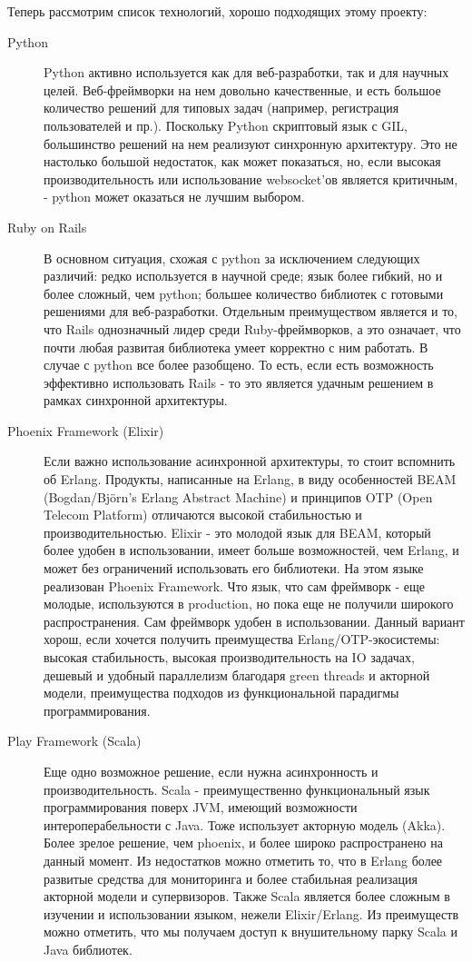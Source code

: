 Теперь рассмотрим список технологий, хорошо подходящих этому проекту:

\begin{description}
	\item[Python] Python активно используется как для веб-разработки, так и для научных целей. Веб-фреймворки на нем довольно качественные, и есть большое количество решений для типовых задач (например, регистрация пользователей и пр.). Поскольку Python скриптовый язык с GIL, большинство решений на нем реализуют синхронную архитектуру. Это не настолько большой недостаток, как может показаться, но, если высокая производительность или использование websocket'ов является критичным, - python может оказаться не лучшим выбором.
	\item[Ruby on Rails] В основном ситуация, схожая с python за исключением следующих различий: редко используется в научной среде; язык более гибкий, но и более сложный, чем python; большее количество библиотек с готовыми решениями для веб-разработки. Отдельным преимуществом является и то, что Rails однозначный лидер среди Ruby-фреймворков, а это означает, что почти любая развитая библиотека умеет корректно с ним работать. В случае с python все более разобщено. То есть, если есть возможность эффективно использовать Rails - то это является удачным решением в рамках синхронной архитектуры.
	\item[Phoenix Framework (Elixir)] Если важно использование асинхронной архитектуры, то стоит вспомнить об Erlang. Продукты, написанные на Erlang, в виду особенностей BEAM (Bogdan/Björn’s Erlang Abstract Machine) и принципов OTP (Open Telecom Platform) отличаются высокой стабильностью и производительностью. Elixir - это молодой язык для BEAM, который более удобен в использовании, имеет больше возможностей, чем Erlang, и может без ограничений использовать его библиотеки. На этом языке реализован Phoenix Framework. Что язык, что сам фреймворк - еще молодые, используются в production, но пока еще не получили широкого распространения. Сам фреймворк удобен в использовании. Данный вариант хорош, если хочется получить преимущества Erlang/OTP-экосистемы: высокая стабильность, высокая производительность на IO задачах, дешевый и удобный параллелизм благодаря green threads и акторной модели, преимущества подходов из функциональной парадигмы программирования.
	\item[Play Framework (Scala)] Еще одно возможное решение, если нужна асинхронность и производительность. Scala - преимущественно функциональный язык программирования поверх JVM, имеющий возможности интероперабельности с Java. Тоже использует акторную модель (Akka). Более зрелое решение, чем phoenix, и более широко распространено на данный момент. Из недостатков можно отметить то, что в Erlang более развитые средства для мониторинга и более стабильная реализация акторной модели и супервизоров. Также Scala является более сложным в изучении и использовании языком, нежели Elixir/Erlang. Из преимуществ можно отметить, что мы получаем доступ к внушительному парку Scala и Java библиотек.
\end{description}



